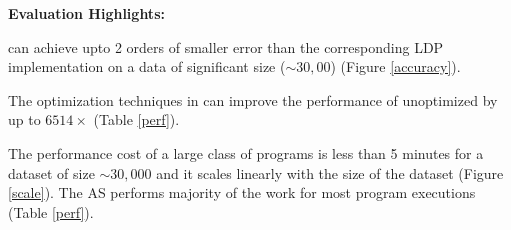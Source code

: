 \textbf{Evaluation Highlights:}
\squishlist \item \system can achieve upto 2 orders of smaller error than the corresponding
\textsf{LDP} implementation on a data of significant size ($\sim 30,00$) (Figure \ref{accuracy}).
\item The optimization techniques in \system can improve the performance
of unoptimized \system by up to $6514\times$ (Table \ref{perf}).
\item The performance cost of a large class of \system programs is
less than 5 minutes for a dataset of size $\sim 30,000$  and it scales linearly with the size of the dataset (Figure \ref{scale}). The \textsf{AS} performs majority of the work for most program executions (Table \ref{perf}).
\squishend
